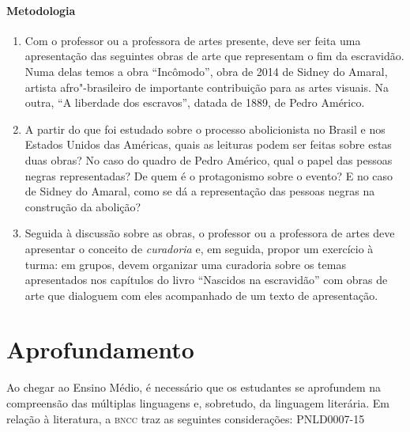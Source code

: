 \documentclass[11pt]{extarticle}
\begin{document}
\paragraph{Metodologia} 

\begin{enumerate}
  \item 
  Com o professor ou a professora de artes presente, deve ser feita uma apresentação
  das seguintes obras de arte que representam o fim da escravidão. 
  Numa delas temos a obra ``Incômodo'', obra de 2014 de Sidney do Amaral, artista afro"-brasileiro
  de importante contribuição para as artes visuais. Na outra, ``A liberdade dos escravos'', datada de
  1889, de Pedro Américo.


  \item
  A partir do que foi estudado sobre o processo abolicionista no Brasil e 
  nos Estados Unidos das
  Américas, quais as leituras podem ser feitas sobre estas duas obras?
  No caso do quadro de Pedro Américo, qual o papel das pessoas negras
  representadas? De quem é o protagonismo sobre o evento? 
  E no caso de Sidney do Amaral, como se dá a representação
  das pessoas negras na construção da abolição?

  \item
  Seguida à discussão sobre as obras, o professor ou a professora de 
  artes deve apresentar o conceito de \textit{curadoria} e, em seguida,
  propor um exercício à turma: em grupos, devem organizar uma 
  curadoria sobre os temas apresentados nos capítulos do livro ``Nascidos
  na escravidão'' com obras de arte que dialoguem com eles 
  acompanhado de um texto de apresentação. 
\end{enumerate}


\section{Aprofundamento}

Ao chegar ao Ensino Médio, é necessário que os estudantes se aprofundem
na compreensão das múltiplas linguagens e, sobretudo, da linguagem
literária. Em relação à literatura, a \textsc{bncc} traz as seguintes
considerações:
  {PNLD0007-15}
\end{document}
